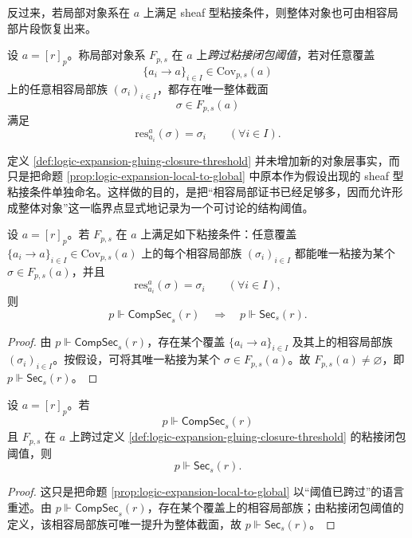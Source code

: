 反过来，若局部对象系在 \(a\) 上满足 sheaf 型粘接条件，则整体对象也可由相容局部片段恢复出来。

\begin{definition}[粘接闭包阈值]\label{def:logic-expansion-gluing-closure-threshold}
设 \(a=[r]_p\)。称局部对象系 \(F_{p,s}\) 在 \(a\) 上\emph{跨过粘接闭包阈值}，若对任意覆盖
\[
\{a_i\to a\}_{i\in I}\in \mathrm{Cov}_{p,s}(a)
\]
上的任意相容局部族 \((\sigma_i)_{i\in I}\)，都存在唯一整体截面
\[
\sigma\in F_{p,s}(a)
\]
满足
\[
\mathrm{res}^{a}_{a_i}(\sigma)=\sigma_i
\qquad(\forall i\in I).
\]
\end{definition}

定义 \ref{def:logic-expansion-gluing-closure-threshold} 并未增加新的对象层事实，而只是把命题 \ref{prop:logic-expansion-local-to-global} 中原本作为假设出现的 sheaf 型粘接条件单独命名。这样做的目的，是把“相容局部证书已经足够多，因而允许形成整体对象”这一临界点显式地记录为一个可讨论的结构阈值。

\begin{proposition}[局部到整体原理]\label{prop:logic-expansion-local-to-global}
设 \(a=[r]_p\)。若 \(F_{p,s}\) 在 \(a\) 上满足如下粘接条件：任意覆盖 \(\{a_i\to a\}_{i\in I}\in \mathrm{Cov}_{p,s}(a)\) 上的每个相容局部族 \((\sigma_i)_{i\in I}\) 都能唯一粘接为某个 \(\sigma\in F_{p,s}(a)\)，并且
\[
\mathrm{res}^{a}_{a_i}(\sigma)=\sigma_i
\qquad(\forall i\in I),
\]
则
\[
p\Vdash \mathsf{CompSec}_s(r)
\quad\Longrightarrow\quad
p\Vdash \mathsf{Sec}_s(r).
\]
\end{proposition}

\begin{proof}
由 \(p\Vdash \mathsf{CompSec}_s(r)\)，存在某个覆盖 \(\{a_i\to a\}_{i\in I}\) 及其上的相容局部族 \((\sigma_i)_{i\in I}\)。按假设，可将其唯一粘接为某个 \(\sigma\in F_{p,s}(a)\)。故 \(F_{p,s}(a)\neq \varnothing\)，即 \(p\Vdash \mathsf{Sec}_s(r)\)。
\end{proof}

\begin{proposition}[闭包阈值跨越推出整体对象]\label{prop:logic-expansion-threshold-crossing-gives-global}
设 \(a=[r]_p\)。若
\[
p\Vdash \mathsf{CompSec}_s(r)
\]
且 \(F_{p,s}\) 在 \(a\) 上跨过定义 \ref{def:logic-expansion-gluing-closure-threshold} 的粘接闭包阈值，则
\[
p\Vdash \mathsf{Sec}_s(r).
\]
\end{proposition}

\begin{proof}
这只是把命题 \ref{prop:logic-expansion-local-to-global} 以“阈值已跨过”的语言重述。由 \(p\Vdash \mathsf{CompSec}_s(r)\)，存在某个覆盖上的相容局部族；由粘接闭包阈值的定义，该相容局部族可唯一提升为整体截面，故 \(p\Vdash \mathsf{Sec}_s(r)\)。
\end{proof}

